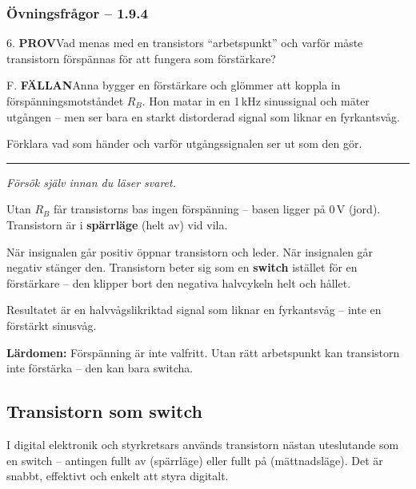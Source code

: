 \documentclass[a4paper,11pt,twoside]{book}
\newcommand{\qprov}{\colorbox{redpale}{\textcolor{reddark}{\headingfont\bfseries\tiny PROV}}}
\newcommand{\qfallan}{\colorbox{ljusbrun}{\textcolor{kakao}{\headingfont\bfseries\tiny FÄLLAN}}}
\begin{document}
\subsubsection*{Övningsfrågor -- 1.9.4}

\begin{qblock}{6.}
\qprov\quad Vad menas med en transistors ``arbetspunkt''
och varför måste transistorn förspännas för att fungera
som förstärkare?
\end{qblock}

\begin{qblock}{F.}
\qfallan\quad Anna bygger en förstärkare och glömmer
att koppla in förspänningsmotståndet $R_B$.
Hon matar in en 1\,kHz sinussignal och mäter utgången --
men ser bara en starkt distorderad signal som liknar
en fyrkantsvåg.

Förklara vad som händer och varför utgångssignalen
ser ut som den gör.
\end{qblock}

\medskip
\noindent\rule{\textwidth}{0.4pt}
{\small\itshape Försök själv innan du läser svaret.}
\medskip

\begin{worked}[title={Lösning -- Fallgropsfråga 1.9.4\,F}]
Utan $R_B$ får transistorns bas ingen förspänning -- basen
ligger på 0\,V (jord). Transistorn är i \textbf{spärrläge}
(helt av) vid vila.

När insignalen går positiv öppnar transistorn och leder.
När insignalen går negativ stänger den. Transistorn beter sig
som en \textbf{switch} istället för en förstärkare -- den klipper
bort den negativa halvcykeln helt och hållet.

Resultatet är en halvvågslikriktad signal som liknar en
fyrkantsvåg -- inte en förstärkt sinusvåg.

\textbf{Lärdomen:} Förspänning är inte valfritt. Utan rätt
arbetspunkt kan transistorn inte förstärka -- den kan bara
switcha.
\end{worked}

\subsection{Transistorn som switch}

I digital elektronik och styrkretsars används transistorn nästan
uteslutande som en switch -- antingen fullt av (spärrläge) eller
fullt på (mättnadsläge). Det är snabbt, effektivt och enkelt
att styra digitalt.
\end{document}
